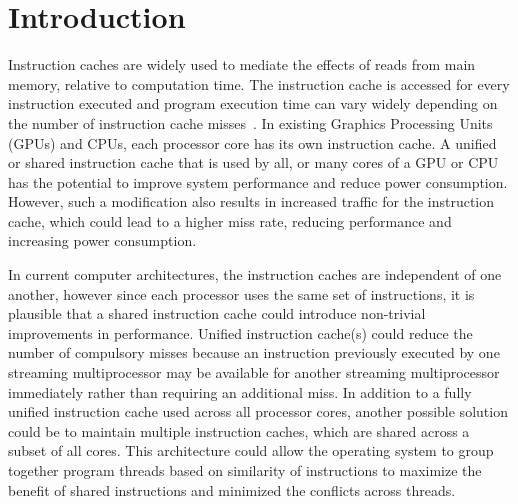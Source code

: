\section{Introduction}


Instruction caches are widely used to mediate the effects of reads
from main memory, relative to computation time. 
The instruction cache is accessed for every instruction executed and
program execution time can vary widely depending on the number of
instruction cache misses~\cite{arnold94}. 
In existing Graphics Processing Units (GPUs) and CPUs, each processor
core has its own instruction cache. 
A unified or shared instruction cache that is used by all, or many
cores of a GPU or CPU has the potential to improve system performance
and reduce power consumption.
However, such a modification also results in increased traffic for the
instruction cache, which could lead to a higher miss rate, reducing
performance and increasing power consumption. 


In current computer architectures, the instruction caches are
independent of one another, however since each processor uses the same
set of instructions, it is plausible that a shared instruction cache
could introduce non-trivial improvements in performance. 
Unified instruction cache(s) could reduce the number of compulsory
misses because an instruction previously executed by one streaming
multiprocessor may be available for another streaming multiprocessor
immediately rather than requiring an additional miss. 
In addition to a fully unified instruction cache used across all
processor cores, another possible solution could be to maintain
multiple instruction caches, which are shared across a subset of all
cores. 
This architecture could allow the operating system to group together
program threads based on similarity of instructions to maximize the
benefit of shared instructions and minimized the conflicts across
threads. 

